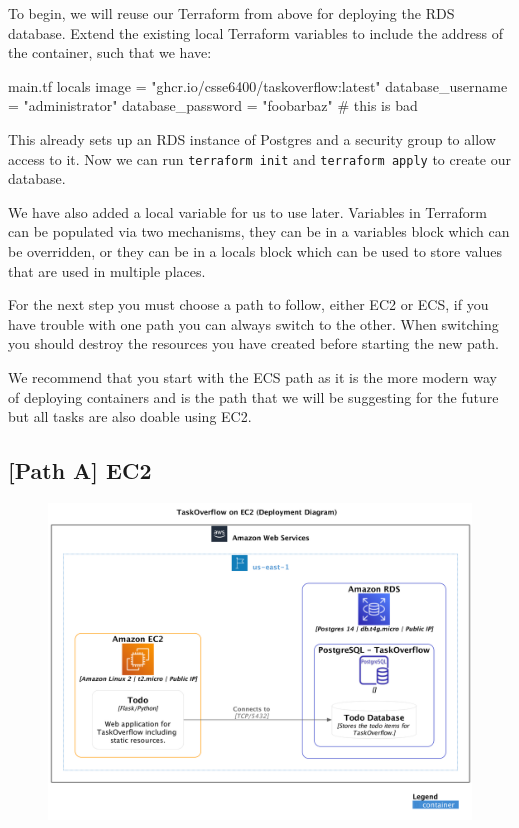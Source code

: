\documentclass{csse4400}
\begin{document}
To begin, we will reuse our Terraform from above for deploying the RDS database.
Extend the existing local Terraform variables to include the address of the container, such that we have:

\begin{code}[language=terraform,numbers=none]{main.tf}
locals {
    image             = "ghcr.io/csse6400/taskoverflow:latest"
    database_username = "administrator"
    database_password = "foobarbaz" # this is bad
}
\end{code}

This already sets up an RDS instance of Postgres and a security group to allow access to it.
Now we can run \texttt{terraform init} and \texttt{terraform apply} to create our database.

We have also added a local variable for us to use later.
Variables in Terraform can be populated via two mechanisms,
they can be in a variables block which can be overridden,
or they can be in a locals block which can be used to store values that are used in multiple places.

For the next step you must choose a path to follow,
either EC2 or ECS,
if you have trouble with one path you can always switch to the other.
When switching you should destroy the resources you have created before starting the new path.

We recommend that you start with the ECS path as it is the more modern way of deploying containers and is the path that we will be suggesting for the future but all tasks are also doable using EC2.

\subsection{[Path A] EC2}


\begin{figure}[H]
  \includegraphics[width=\textwidth]{diagrams/ec2deployment}
\end{figure}
\end{document}
